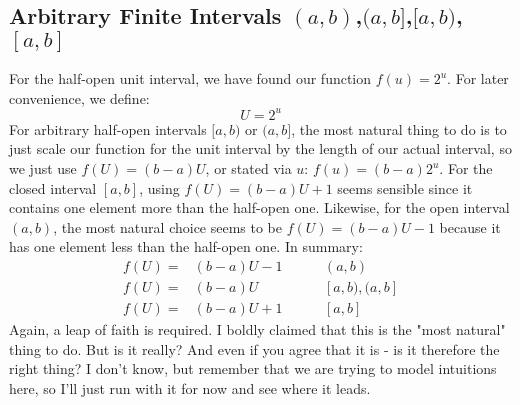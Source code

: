 \documentclass[12pt]{article}
\begin{document}
\subsection{Arbitrary Finite Intervals $(a,b)$,$(a,b]$,$[a,b)$,$[a,b]$}
For the half-open unit interval, we have found our function $f(u) = 2^u$. For later convenience, we define: 
\begin{equation}
	U = 2^u
\end{equation}
For arbitrary half-open intervals $[a,b)$ or $(a,b]$, the most natural thing to do is to just scale our function for the unit interval by the length of our actual interval, so we just use $f(U) = (b-a) U$, or stated via $u$: $f(u) = (b-a) 2^u$. For the closed interval $[a,b]$, using $f(U) = (b-a) U + 1$ seems sensible since it contains one element more than the half-open one. Likewise, for the open interval $(a,b)$, the most natural choice seems to be $f(U) = (b-a) U - 1$ because it has one element less than the half-open one. In summary:
\begin{eqnarray}
 f(U) =& (b-a) U - 1                 & \qquad (a,b) \\
 f(U) =& (b-a) U \quad \; \; \, \,   & \qquad [a,b),(a,b] \\
 f(U) =& (b-a) U + 1                 & \qquad [a,b]
\end{eqnarray}
Again, a leap of faith is required. I boldly claimed that this is the "most natural" thing to do. But is it really? And even if you agree that it is - is it therefore the right thing? I don't know, but remember that we are trying to model intuitions here, so I'll just run with it for now and see where it leads.
\end{document}
